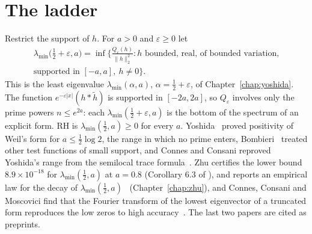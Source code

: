 \section{The ladder}\label{dc:sec:ladder}

Restrict the support of $h$. For $a>0$ and $\varepsilon\ge0$ let
\begin{multline*}
\lambda_{\min}\big(\tfrac12+\varepsilon,a\big)=\inf\Big\{\frac{Q_\varepsilon(h)}{\|h\|_2^2}:h\text{ bounded, real, of bounded variation,}\\ \text{supported in }[-a,a],\ h\ne0\Big\}.
\end{multline*}
This is the least eigenvalue $\lambda_{\min}(\alpha,a)$, $\alpha=\frac12+\varepsilon$, of Chapter~\ref{chap:yoshida}. The function $e^{-\varepsilon|x|}(h*\tilde h)$ is supported in $[-2a,2a]$, so $Q_\varepsilon$ involves only the prime powers $n\le e^{2a}$: each $\lambda_{\min}(\frac12+\varepsilon,a)$ is the bottom of the spectrum of an explicit form. RH is $\lambda_{\min}(\frac12,a)\ge0$ for every $a$. Yoshida~\cite[Theorem 1]{Yoshida92} proved positivity of Weil's form for $a\le\frac12\log2$, the range in which no prime enters, Bombieri~\cite{Bombieri} treated other test functions of small support, and Connes and Consani reproved Yoshida's range from the semilocal trace formula~\cite{ConnesConsani21}. Zhu certifies the lower bound $8.9\times10^{-18}$ for $\lambda_{\min}(\frac12,a)$ at $a=0.8$ (Corollary 6.3 of \cite{Zhu26}), and reports an empirical law for the decay of $\lambda_{\min}(\frac12,a)$~\cite{Zhu26} (Chapter~\ref{chap:zhu}), and Connes, Consani and Moscovici find that the Fourier transform of the lowest eigenvector of a truncated form reproduces the low zeros to high accuracy~\cite{CCM25}. The last two papers are cited as preprints.

